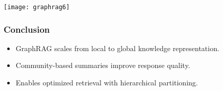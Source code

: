 \begin{frame}[fragile]\frametitle{}

	\begin{center}
	\texttt{[image: graphrag6]}
	\end{center}
	
\end{frame}






	



	


	


\begin{frame}[fragile]\frametitle{Conclusion}
    \begin{itemize}
        \item GraphRAG scales from local to global knowledge representation.
        \item Community-based summaries improve response quality.
        \item Enables optimized retrieval with hierarchical partitioning.
    \end{itemize}
\end{frame}







